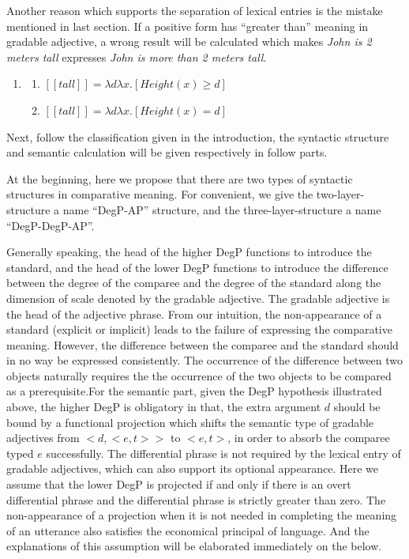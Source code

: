 \documentclass{ctexart}
\begin{document}
Another reason which supports the separation of lexical entries is the mistake mentioned in last section. If a positive form has ``greater than'' meaning in gradable adjective, a wrong result will be calculated which makes \textit{John is 2 meters tall} expresses \textit{John is more than 2 meters tall}.

\begin{enumerate}
    \item \label{tallLE_re}
    
    \begin{enumerate}
        \item \label{tallLE_re_a} 
        $[\![tall]\!]=\lambda d \lambda x.[Height(x) \geq d]$
    
        \item \label{tallLE_re_b} 
        $[\![tall]\!]=\lambda d \lambda x.[Height(x) = d]$
    
    \end{enumerate}
\end{enumerate}

Next, follow the classification given in the introduction, the syntactic structure and semantic calculation will be given respectively in follow parts.

\noindent
At the beginning, here we propose that there are two types of syntactic structures in comparative meaning. For convenient, we give the two-layer-structure a name ``DegP-AP'' structure, and the three-layer-structure a name ``DegP-DegP-AP''. 

Generally speaking, the head of the higher DegP functions to introduce the standard, and the head of the lower DegP functions to introduce the difference between the degree of the comparee and the degree of the standard along the dimension of scale denoted by the gradable adjective. The gradable adjective is the head of the adjective phrase. From our intuition, the non-appearance of a standard (explicit or implicit) leads to the failure of expressing the comparative meaning. However, the difference between the comparee and the standard should in no way be expressed consistently. The occurrence of the difference between two objects naturally requires the the occurrence of the two objects to be compared as a prerequisite.For the semantic part, given the DegP hypothesis illustrated above, the higher DegP is obligatory in that, the extra argument $d$ should be bound by a functional projection which shifts the semantic type of gradable adjectives from $<d,<e,t>>$ to $<e,t>$, in order to absorb the comparee typed $e$ successfully. The differential phrase is not required by the lexical entry of gradable adjectives, which can also support its optional appearance. Here we assume that the lower DegP is projected if and only if there is an overt differential phrase and the differential phrase is strictly greater than zero. The non-appearance of a projection when it is not needed in completing the meaning of an utterance also satisfies the economical principal of language. And the explanations of this assumption will be elaborated immediately on the below.
\end{document}
